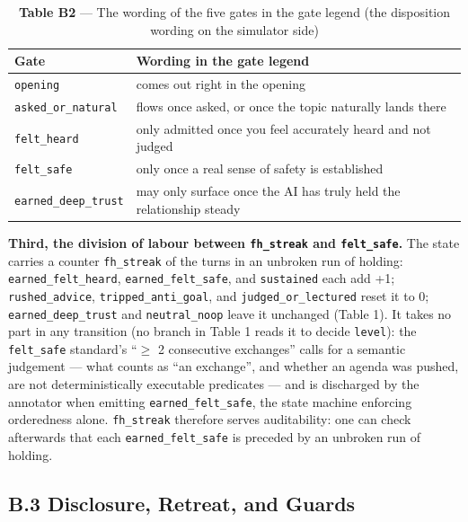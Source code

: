 \documentclass[letterpaper]{article}
\begin{document}
\begin{table}[t]
\centering\footnotesize
\setlength{\tabcolsep}{4pt}
\caption{\textbf{Table B2} --- The wording of the five gates in the gate legend (the disposition wording on the simulator side)}
\begin{tabular}{@{}>{\raggedright\arraybackslash}p{}>{\raggedright\arraybackslash}p{}@{}}
\toprule
Gate & Wording in the gate legend \\
\midrule
\texttt{opening} & comes out right in the opening \\
\texttt{asked\_or\_natural} & flows once asked, or once the topic naturally lands there \\
\texttt{felt\_heard} & only admitted once you feel accurately heard and not judged \\
\texttt{felt\_safe} & only once a real sense of safety is established \\
\texttt{earned\_deep\_trust} & may only surface once the AI has truly held the relationship steady \\
\bottomrule
\end{tabular}
\end{table}

\textbf{Third, the division of labour between \texttt{fh\_streak} and \texttt{felt\_safe}.} The state carries a counter \texttt{fh\_streak} of the turns in an unbroken run of holding: \texttt{earned\_felt\_heard}, \texttt{earned\_felt\_safe}, and \texttt{sustained} each add +1; \texttt{rushed\_advice}, \texttt{tripped\_anti\_goal}, and \texttt{judged\_or\_lectured} reset it to 0; \texttt{earned\_deep\_trust} and \texttt{neutral\_noop} leave it unchanged (Table 1). It takes no part in any transition (no branch in Table 1 reads it to decide \texttt{level}): the \texttt{felt\_safe} standard's ``$\geq$ 2 consecutive exchanges'' calls for a semantic judgement --- what counts as ``an exchange'', and whether an agenda was pushed, are not deterministically executable predicates --- and is discharged by the annotator when emitting \texttt{earned\_felt\_safe}, the state machine enforcing orderedness alone. \texttt{fh\_streak} therefore serves auditability: one can check afterwards that each \texttt{earned\_felt\_safe} is preceded by an unbroken run of holding.


\subsection*{B.3 Disclosure, Retreat, and Guards}
\end{document}

